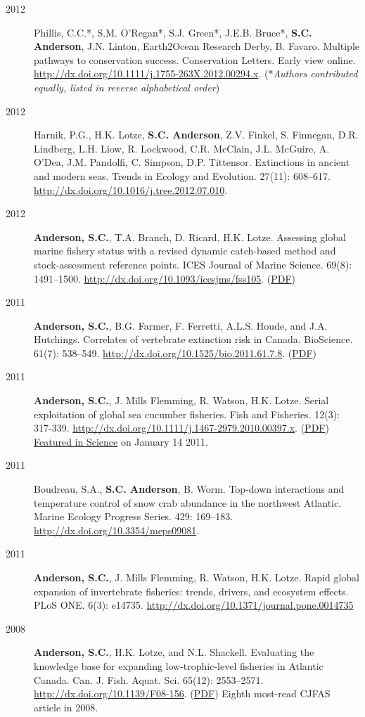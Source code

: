 \begin{description}
\item[2012]
Phillis, C.C.*, S.M. O'Regan*, S.J. Green*, J.E.B. Bruce*, \textbf{S.C.
Anderson}, J.N. Linton, Earth2Ocean Research Derby, B. Favaro. Multiple
pathways to conservation success. Conservation Letters. Early view
online. \url{http://dx.doi.org/10.1111/j.1755-263X.2012.00294.x}.
(*\emph{Authors contributed equally, listed in reverse alphabetical
order})
\item[2012]
Harnik, P.G., H.K. Lotze, \textbf{S.C. Anderson}, Z.V. Finkel, S.
Finnegan, D.R. Lindberg, L.H. Liow, R. Lockwood, C.R. McClain, J.L.
McGuire, A. O'Dea, J.M. Pandolfi, C. Simpson, D.P. Tittensor.
Extinctions in ancient and modern seas. Trends in Ecology and Evolution.
27(11): 608--617. \url{http://dx.doi.org/10.1016/j.tree.2012.07.010}.
\item[2012]
\textbf{Anderson, S.C.}, T.A. Branch, D. Ricard, H.K. Lotze. Assessing
global marine fishery status with a revised dynamic catch-based method
and stock-assessment reference points. ICES Journal of Marine Science.
69(8): 1491--1500. \url{http://dx.doi.org/10.1093/icesjms/fss105}.
(\href{http://icesjms.oxfordjournals.org/cgi/reprint/fss105?ijkey=pFRzMGEDycomI3X\&keytype=ref}{PDF})
\item[2011]
\textbf{Anderson, S.C.}, B.G. Farmer, F. Ferretti, A.L.S. Houde, and
J.A. Hutchings. Correlates of vertebrate extinction risk in Canada.
BioScience. 61(7): 538--549.
\url{http://dx.doi.org/10.1525/bio.2011.61.7.8}.
(\href{papers/Anderson_etal_2011_BioScience_with_supplement.pdf}{PDF})
\item[2011]
\textbf{Anderson, S.C.}, J. Mills Flemming, R. Watson, H.K. Lotze.
Serial exploitation of global sea cucumber fisheries. Fish and
Fisheries. 12(3): 317-339.
\url{http://dx.doi.org/10.1111/j.1467-2979.2010.00397.x}.
(\href{papers/Anderson_etal_2011_seacucumbers_with_supplement.pdf}{PDF})
\href{http://www.sciencemag.org/content/331/6014/129.1.full}{Featured in
Science} on January 14 2011.
\item[2011]
Boudreau, S.A., \textbf{S.C. Anderson}, B. Worm. Top-down interactions
and temperature control of snow crab abundance in the northwest
Atlantic. Marine Ecology Progress Series. 429: 169--183.
\url{http://dx.doi.org/10.3354/meps09081}.
\item[2011]
\textbf{Anderson, S.C.}, J. Mills Flemming, R. Watson, H.K. Lotze. Rapid
global expansion of invertebrate fisheries: trends, drivers, and
ecosystem effects. PLoS ONE. 6(3): e14735.
\url{http://dx.doi.org/10.1371/journal.pone.0014735}
\item[2008]
\textbf{Anderson, S.C.}, H.K. Lotze, and N.L. Shackell. Evaluating the
knowledge base for expanding low-trophic-level fisheries in Atlantic
Canada. Can. J. Fish. Aquat. Sci. 65(12): 2553--2571.
\url{http://dx.doi.org/10.1139/F08-156}.
(\href{papers/Anderson_etal_2008_knowledge.pdf}{PDF}) Eighth most-read
CJFAS article in 2008.
\end{description}

